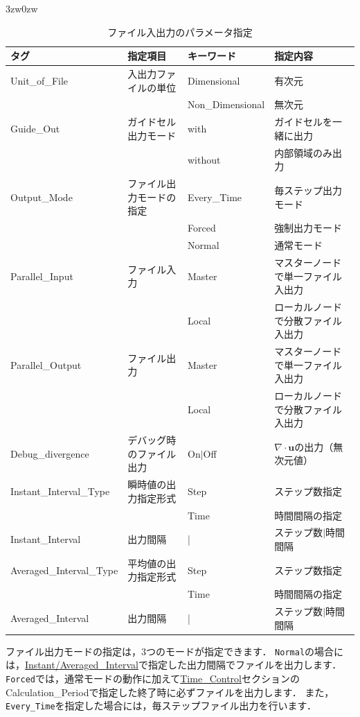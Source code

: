 \begin{indentation}{3zw}{0zw}
\begin{table}[htdp]
\caption{ファイル入出力のパラメータ指定}
\begin{center}
\small
\begin{tabular}{llll} \toprule
タグ & 指定項目 & キーワード & 指定内容 \\ \midrule
Unit\_of\_File & 入出力ファイルの単位 & Dimensional & 有次元\\
& & Non\_Dimensional & 無次元\\ \hline
Guide\_Out & ガイドセル出力モード & with & ガイドセルを一緒に出力\\
& & without & 内部領域のみ出力\\ \hline
Output\_Mode & ファイル出力モードの指定 & Every\_Time & 毎ステップ出力モード\\
& & Forced & 強制出力モード\\
& & Normal & 通常モード\\ \hline
Parallel\_Input & ファイル入力 & Master & マスターノードで単一ファイル入出力\\
& & Local  & ローカルノードで分散ファイル入出力 \\ \hline
Parallel\_Output & ファイル出力 & Master & マスターノードで単一ファイル入出力\\
& & Local  & ローカルノードで分散ファイル入出力 \\ \hline
Debug\_divergence & デバッグ時のファイル出力 & On$|$Off & $\nabla \cdot \bm{u}$の出力（無次元値）\\ \hline
Instant\_Interval\_Type & 瞬時値の出力指定形式 & Step & ステップ数指定\\
& & Time & 時間間隔の指定\\
Instant\_Interval & 出力間隔 & | & ステップ数$|$時間間隔\\ \hline
Averaged\_Interval\_Type & 平均値の出力指定形式 & Step & ステップ数指定\\
& & Time & 時間間隔の指定\\
Averaged\_Interval & 出力間隔 & | & ステップ数$|$時間間隔\\\bottomrule
\end{tabular}
\end{center}
\label{tbl:file_IO_parameter}
\end{table}

ファイル出力モードの指定は，3つのモードが指定できます．
\verb|Normal|の場合には，\hyperlink{tgt:interval}{Instant/Averaged\_Interval}で指定した出力間隔でファイルを出力します．
\verb|Forced|では，通常モードの動作に加えて\hyperlink{tgt:time_control}{Time\_Control}セクションのCalculation\_Periodで指定した終了時に必ずファイルを出力します．
また，\verb|Every_Time|を指定した場合には，毎ステップファイル出力を行います．


\end{indentation}
